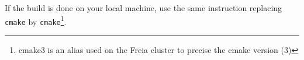\documentclass[11pt,a4paper]{report}
\newcommand{\indat}{\mbox{\texttt{IN.DAT}}}
\newcommand{\mfile}{\mbox{\texttt{MFILE.DAT}}}
\newcommand{\outdat}{\mbox{\texttt{OUT.DAT}}}
\newcommand{\plotdat}{\mbox{\texttt{PLOT.DAT}}}
\newcommand{\process}{\mbox{\texttt{PROCESS}}}
\begin{document}
If the build is done on your local machine, use the same instruction replacing \texttt{cmake} by \texttt{cmake}\footnote{cmake3 is an alias used on the Freia cluster to precise the cmake version (3)}.\newline







\end{document}
